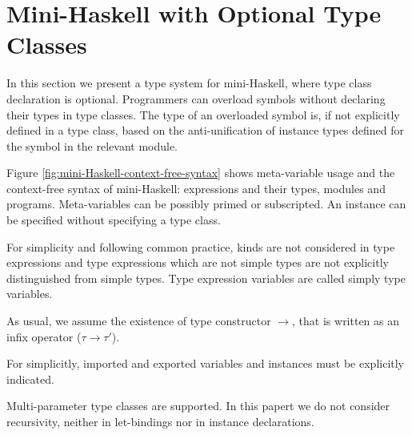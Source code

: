 \section{Mini-Haskell with Optional Type Classes}
\label{Optional-type-classes}

In this section we present a type system for mini-Haskell, where type
class declaration is optional. Programmers can overload symbols
without declaring their types in type classes. The type of an
overloaded symbol is, if not explicitly defined in a type class, based
on the anti-unification of instance types defined for the symbol in
the relevant module.

Figure \ref{fig:mini-Haskell-context-free-syntax} shows meta-variable
usage and the context-free syntax of mini-Haskell: expressions and
their types, modules and programs. Meta-variables can be possibly
primed or subscripted. An instance can be specified without specifying
a type class. 


For simplicity and following common practice, kinds are not considered
in type expressions and type expressions which are not simple types
are not explicitly distinguished from simple types. Type expression
variables are called simply type variables. 

As usual, we assume the existence of type constructor $\to$, that is
written as an infix operator ($\tau \to \tau'$). 

For simplicitly, imported and exported variables and instances must be
explicitly indicated. 

Multi-parameter type classes are supported. In this papert we do not
consider recursivity, neither in let-bindings nor in instance
declarations. 

